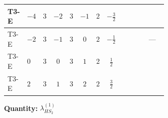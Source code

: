 \documentclass[8pt]{article}
\begin{document}
\begin{landscape}
\begin{longtable}{@{}llcccccc >{\raggedright\arraybackslash}p{0.21\linewidth} >{\raggedright\arraybackslash}p{0.21\linewidth} >{\raggedright\arraybackslash}p{0.21\linewidth}@{}}
\midrule
T3-E & $-4$ & $3$ & $-2$ & $3$ & $-1$ & $2$ & $-\frac{3}{2}$ & \scriptsize\adjustbox{max width=\linewidth}{$\begin{gathered} +6 {g_2}^4\end{gathered}$} & \scriptsize\adjustbox{max width=\linewidth}{$\begin{gathered} -\frac{33 {g_2}^2 {\lambda_{HS_2}^{(1)}}}{2}\end{gathered}$} & \scriptsize\adjustbox{max width=\linewidth}{$\begin{gathered} +3 {g_1}^4\end{gathered}$} \\
\midrule
T3-E & $-2$ & $3$ & $-1$ & $3$ & $0$ & $2$ & $-\frac{1}{2}$ & \scriptsize\adjustbox{max width=\linewidth}{$\begin{gathered} +6 {g_2}^4\end{gathered}$} & \scriptsize\adjustbox{max width=\linewidth}{$\begin{gathered} -\frac{33 {g_2}^2 {\lambda_{HS_2}^{(1)}}}{2}\end{gathered}$} & --- \\
\midrule
T3-E & $0$ & $3$ & $0$ & $3$ & $1$ & $2$ & $\frac{1}{2}$ & \scriptsize\adjustbox{max width=\linewidth}{$\begin{gathered} +6 {g_2}^4\end{gathered}$} & \scriptsize\adjustbox{max width=\linewidth}{$\begin{gathered} -\frac{33 {g_2}^2 {\lambda_{HS_2}^{(1)}}}{2}\end{gathered}$} & \scriptsize\adjustbox{max width=\linewidth}{$\begin{gathered} +3 {g_1}^4\end{gathered}$} \\
\midrule
T3-E & $2$ & $3$ & $1$ & $3$ & $2$ & $2$ & $\frac{3}{2}$ & \scriptsize\adjustbox{max width=\linewidth}{$\begin{gathered} +6 {g_2}^4\end{gathered}$} & \scriptsize\adjustbox{max width=\linewidth}{$\begin{gathered} -\frac{33 {g_2}^2 {\lambda_{HS_2}^{(1)}}}{2}\end{gathered}$} & \scriptsize\adjustbox{max width=\linewidth}{$\begin{gathered} +12 {g_1}^4\end{gathered}$} \\
\midrule
\bottomrule
\end{longtable}
\clearpage
\noindent\textbf{Quantity: }$\lambda_{HS_2}^{(1)}$\par\smallskip

\end{landscape}
\end{document}

